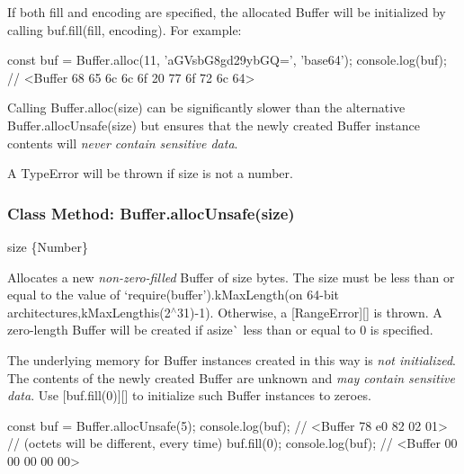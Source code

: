 If both {\ttfamily fill} and {\ttfamily encoding} are specified, the allocated {\ttfamily Buffer} will be initialized by calling {\ttfamily buf.\+fill(fill, encoding)}. For example\+:


\begin{DoxyCode}
const buf = Buffer.alloc(11, 'aGVsbG8gd29ybGQ=', 'base64');
console.log(buf);
  // <Buffer 68 65 6c 6c 6f 20 77 6f 72 6c 64>
\end{DoxyCode}


Calling {\ttfamily Buffer.\+alloc(size)} can be significantly slower than the alternative {\ttfamily Buffer.\+alloc\+Unsafe(size)} but ensures that the newly created {\ttfamily Buffer} instance contents will {\itshape never contain sensitive data}.

A {\ttfamily Type\+Error} will be thrown if {\ttfamily size} is not a number.

\subsubsection*{Class Method\+: Buffer.\+alloc\+Unsafe(size)}


\begin{DoxyItemize}
\item {\ttfamily size} \{Number\}
\end{DoxyItemize}

Allocates a new {\itshape non-\/zero-\/filled} {\ttfamily Buffer} of {\ttfamily size} bytes. The {\ttfamily size} must be less than or equal to the value of `require(\textquotesingle{}buffer').k\+Max\+Length{\ttfamily (on 64-\/bit architectures,}k\+Max\+Length{\ttfamily is}(2$^\wedge$31)-\/1{\ttfamily ). Otherwise, a \mbox{[}}Range\+Error{\ttfamily \mbox{]}\mbox{[}\mbox{]} is thrown. A zero-\/length Buffer will be created if a}size\`{} less than or equal to 0 is specified.

The underlying memory for {\ttfamily Buffer} instances created in this way is {\itshape not initialized}. The contents of the newly created {\ttfamily Buffer} are unknown and {\itshape may contain sensitive data}. Use \mbox{[}{\ttfamily buf.\+fill(0)}\mbox{]}\mbox{[}\mbox{]} to initialize such {\ttfamily Buffer} instances to zeroes.


\begin{DoxyCode}
const buf = Buffer.allocUnsafe(5);
console.log(buf);
  // <Buffer 78 e0 82 02 01>
  // (octets will be different, every time)
buf.fill(0);
console.log(buf);
  // <Buffer 00 00 00 00 00>
\end{DoxyCode}


